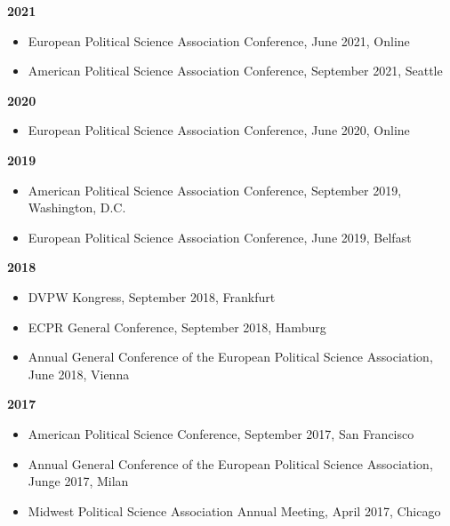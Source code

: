 \textbf{2021}
\begin{itemize}[topsep=0pt, noitemsep, leftmargin=3]
	\item European Political Science Association Conference, June 2021, Online
	\item American Political Science Association Conference, September 2021, Seattle
\end{itemize}

\vspace{\baselineskip}

\textbf{2020}
\begin{itemize}[topsep=0pt, noitemsep, leftmargin=3]
	\item European Political Science Association Conference, June 2020, Online
\end{itemize}

\vspace{\baselineskip}

\textbf{2019}
\begin{itemize}[topsep=0pt, noitemsep, leftmargin=3]
	\item American Political Science Association Conference, September 2019, Washington, D.C.
	\item European Political Science Association Conference, June 2019, Belfast
\end{itemize}

\vspace{\baselineskip}

\textbf{2018}
\begin{itemize}[topsep=0pt, noitemsep, leftmargin=3]
	\item DVPW Kongress, September 2018, Frankfurt
	\item ECPR General Conference, September 2018, Hamburg
	\item Annual General Conference of the European Political Science Association, June 2018, Vienna
\end{itemize}

\vspace{\baselineskip}

\textbf{2017}
\begin{itemize}[topsep=0pt, noitemsep, leftmargin=3]
	\item American Political Science Conference, September 2017, San Francisco
	\item Annual General Conference of the European Political Science Association, Junge 2017, Milan
	\item Midwest Political Science Association Annual Meeting, April 2017, Chicago
\end{itemize}

